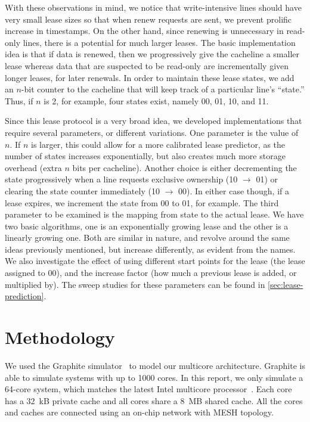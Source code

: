 \documentclass[12pt]{article}
\begin{document}
With these observations in mind, we notice that write-intensive lines should have very small lease sizes so that when renew requests are sent, we prevent prolific increase in timestamps. On the other hand, since renewing is unnecessary in read-only lines, there is a potential for much larger leases.
The basic implementation idea is that if data is renewed, then we progressively give the cacheline a smaller lease whereas data that are suspected to be read-only are incrementally given longer leases, for later renewals. In order to maintain these lease states, we add an $n$-bit counter to the cacheline that will keep track of a particular line’s “state.” Thus, if $n$ is 2, for example, four states exist, namely 00, 01, 10, and 11. 

Since this lease protocol is a very broad idea, we developed implementations that require several parameters, or different variations. One parameter is the value of $n$. If $n$ is larger, this could allow for a more calibrated lease predictor, as the number of states increases exponentially, but also creates much more storage overhead (extra $n$ bits per cacheline). Another choice is either decrementing the state progressively when a line requests exclusive ownership (10 $\rightarrow$ 01) or clearing the state counter immediately (10 $\rightarrow$ 00). In either case though, if a lease expires, we increment the state from 00 to 01, for example. The third parameter to be examined is the mapping from state to the actual lease. We have two basic algorithms, one is an exponentially growing lease and the other is a linearly growing one. Both are similar in nature, and revolve around the same ideas previously mentioned, but increase differently, as evident from the names. We also investigate the effect of using different start points for the lease (the lease assigned to 00), and the increase factor (how much a previous lease is added, or multiplied by). The sweep studies for these parameters can be found in \cref{sec:lease-prediction}.

\section{Methodology}

We used the Graphite simulator~\cite{graphite} to model our multicore 
architecture. Graphite is able to simulate 
systems with up to 1000 cores. In this report, we only simulate a 
64-core system, which matches the latest Intel multicore 
processor~\cite{xeonphi}. Each core has a 32~kB private cache and all 
cores share a 8~MB shared cache. All the cores and caches are 
connected using an on-chip network with MESH topology.
\end{document}
